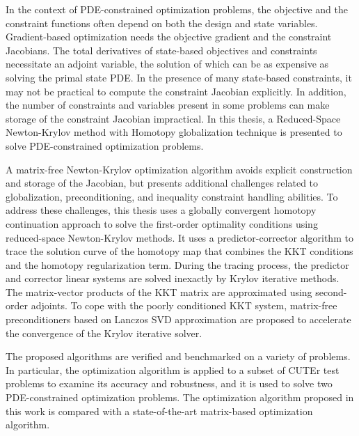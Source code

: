  

 
In the context of PDE-constrained optimization problems, 
the objective and the constraint functions often depend on both the design and state variables. 
Gradient-based optimization needs the objective gradient and the constraint Jacobians. 
The total derivatives of state-based objectives and constraints necessitate an adjoint variable, the solution of which can be as expensive as solving the primal state PDE. In the presence of many state-based constraints, it may not be practical to compute the constraint Jacobian explicitly. In addition, the number of constraints and variables present in some problems can make storage of the constraint Jacobian impractical. In this thesis, a Reduced-Space Newton-Krylov method with Homotopy globalization technique is presented to solve PDE-constrained optimization problems.  
 
 A matrix-free Newton-Krylov optimization algorithm avoids explicit construction and storage of the Jacobian,
 but presents additional challenges related to globalization, preconditioning, and inequality constraint handling abilities. To address these challenges, this thesis uses a globally convergent homotopy continuation approach to solve the first-order optimality conditions using reduced-space Newton-Krylov methods. It uses a predictor-corrector algorithm to trace the solution curve of the homotopy map that combines the KKT conditions and the homotopy regularization term. During the tracing process, the predictor and corrector linear systems are solved inexactly by Krylov iterative methods. The matrix-vector products of the KKT matrix are approximated using second-order adjoints. To cope with the poorly conditioned KKT system, matrix-free preconditioners based on Lanczos SVD approximation are proposed to accelerate the convergence of the Krylov iterative solver.  

The proposed algorithms are verified and benchmarked on a variety of problems. In particular, the optimization algorithm is applied to a subset of CUTEr test problems to examine its accuracy and robustness, and it is used to solve two PDE-constrained optimization problems. The optimization algorithm proposed in this work is compared 
with a state-of-the-art matrix-based optimization algorithm.


